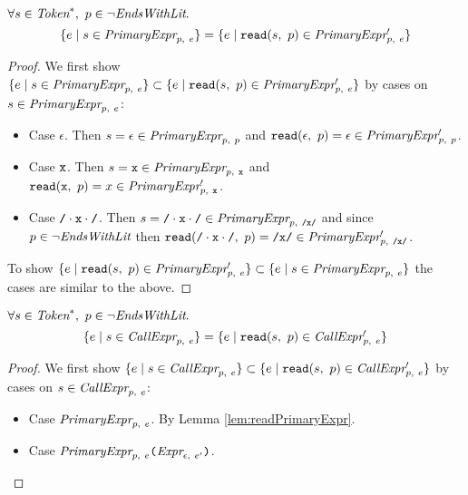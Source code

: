 \documentclass[preprint,10pt]{sigplanconf}
\begin{document}
\begin{lemma}\mbox{}

  \( \forall s \in \textit{Token}^{*},~p \in \neg \textit{EndsWithLit}. \)
  \[
  \{ e \mid s \in \textit{PrimaryExpr}_{p,~e} \}
  =
  \{ e \mid \texttt{read}(s,~p) \in \textit{PrimaryExpr}_{p,~e}' \}
  \]
\end{lemma}
\begin{proof}
  We first show 
  \( \{ e \mid s \in \textit{PrimaryExpr}_{p,~e} \} \subset
  \{ e \mid \texttt{read}(s,~p) \in \textit{PrimaryExpr}_{p,~e}' \}
  \)
  by cases on \( s \in \textit{PrimaryExpr}_{p,~e} \):
  \begin{itemize}

  \item Case \( \epsilon \). Then \( s = \epsilon \in
    \textit{PrimaryExpr}_{p,~p} \) and \(
    \texttt{read}(\epsilon,~p) = \epsilon \in \textit{PrimaryExpr}_{p,~p}' \).

  \item Case \( \texttt{x} \). Then \( s = \texttt{x} \in
    \textit{PrimaryExpr}_{p,~\texttt{x}} \) and \( \texttt{read}(\texttt{x},~p) = x \in
    \textit{PrimaryExpr}_{p,~\texttt{x}}' \).

  \item Case \( \texttt{/} \cdot \texttt{x} \cdot \texttt{/} \). Then \( s = \texttt{/} \cdot \texttt{x} \cdot \texttt{/} \in
    \textit{PrimaryExpr}_{p,~\texttt{/x/}} \) and since \( p \in \neg \textit{EndsWithLit} \)
    then \( \texttt{read}(\texttt{/} \cdot \texttt{x} \cdot \texttt{/},~p) = \texttt{/x/} \in \textit{PrimaryExpr}_{p,~\texttt{/x/}}' \).

  \end{itemize}
  To show 
  \( 
  \{ e \mid \texttt{read}(s,~p) \in \textit{PrimaryExpr}_{p,~e}' \}
  \subset
  \{ e \mid s \in \textit{PrimaryExpr}_{p,~e} \} 
  \) the cases are similar to the above.
\end{proof}

\begin{lemma}\mbox{}

  \( \forall s \in \textit{Token}^{*},~p \in \neg \textit{EndsWithLit}. \)
  \[
  \{ e \mid s \in \textit{CallExpr}_{p,~e} \}
  =
  \{ e \mid \texttt{read}(s,~p) \in \textit{CallExpr}_{p,~e}' \}
  \]
\end{lemma}
\begin{proof}
  We first show 
  \( \{ e \mid s \in \textit{CallExpr}_{p,~e} \} \subset
  \{ e \mid \texttt{read}(s,~p) \in \textit{CallExpr}_{p,~e}' \}
  \)
  by cases on \( s \in \textit{CallExpr}_{p,~e} \):
  \begin{itemize}

  \item Case \( \textit{PrimaryExpr}_{p,~e} \). By Lemma \ref{lem:readPrimaryExpr}.

  \item Case \( \textit{PrimaryExpr}_{p,~e} \texttt{(}\textit{Expr}_{\epsilon,~e'}\texttt{)} \).
  \end{itemize}
\end{proof}
\end{document}
